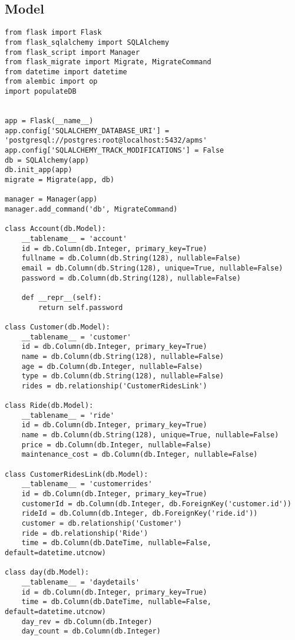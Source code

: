 \subsection{Model}
\thispagestyle{fancy}
\begin{lstlisting}
from flask import Flask
from flask_sqlalchemy import SQLAlchemy
from flask_script import Manager
from flask_migrate import Migrate, MigrateCommand
from datetime import datetime
from alembic import op
import populateDB


app = Flask(__name__)
app.config['SQLALCHEMY_DATABASE_URI'] = 'postgresql://postgres:root@localhost:5432/apms'
app.config['SQLALCHEMY_TRACK_MODIFICATIONS'] = False
db = SQLAlchemy(app)
db.init_app(app)
migrate = Migrate(app, db)

manager = Manager(app)
manager.add_command('db', MigrateCommand)

class Account(db.Model):
    __tablename__ = 'account'
    id = db.Column(db.Integer, primary_key=True)
    fullname = db.Column(db.String(128), nullable=False)
    email = db.Column(db.String(128), unique=True, nullable=False)
    password = db.Column(db.String(128), nullable=False)

    def __repr__(self):
        return self.password

class Customer(db.Model):
    __tablename__ = 'customer'
    id = db.Column(db.Integer, primary_key=True)
    name = db.Column(db.String(128), nullable=False)
    age = db.Column(db.Integer, nullable=False)
    type = db.Column(db.String(128), nullable=False)
    rides = db.relationship('CustomerRidesLink')

class Ride(db.Model):
    __tablename__ = 'ride'
    id = db.Column(db.Integer, primary_key=True)
    name = db.Column(db.String(128), unique=True, nullable=False)
    price = db.Column(db.Integer, nullable=False)
    maintenance_cost = db.Column(db.Integer, nullable=False)

class CustomerRidesLink(db.Model):
    __tablename__ = 'customerrides'
    id = db.Column(db.Integer, primary_key=True)
    customerId = db.Column(db.Integer, db.ForeignKey('customer.id'))
    rideId = db.Column(db.Integer, db.ForeignKey('ride.id'))
    customer = db.relationship('Customer')
    ride = db.relationship('Ride')
    time = db.Column(db.DateTime, nullable=False, default=datetime.utcnow)

class day(db.Model):
    __tablename__ = 'daydetails'
    id = db.Column(db.Integer, primary_key=True)
    time = db.Column(db.DateTime, nullable=False, default=datetime.utcnow)
    day_rev = db.Column(db.Integer)
    day_count = db.Column(db.Integer)


\end{lstlisting}
